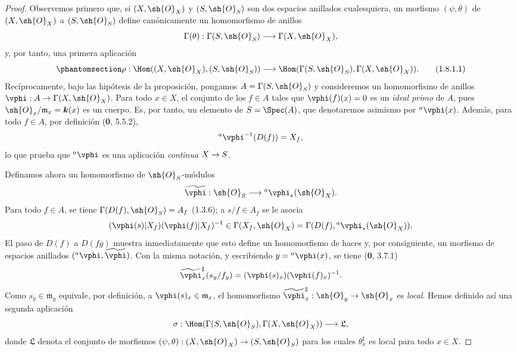 \documentclass[oneside,10pt]{amsart}
\makeatletter
\newcommand{\ega@arrow}[2]{\mathchoice{#1}{#2}{#2}{#2}}
\renewcommand{\to}{\ega@arrow{\longrightarrow}{\rightarrow}}
\let\EGAOriginalLabel\label
\renewcommand{\label}[1]{\phantomsection\EGAOriginalLabel{#1}}
\makeatother
\begin{document}
\begin{proof}
Observemos primero que, si $(X,\sh{O}_X)$ y $(S,\sh{O}_S)$ son dos
espacios anillados cualesquiera, un morfismo $(\psi,\theta)$ de
$(X,\sh{O}_X)$ a $(S,\sh{O}_S)$ define canónicamente un homomorfismo
de anillos
\[
  \Gamma(\theta):\Gamma(S,\sh{O}_S)\to\Gamma(X,\sh{O}_X),
\]
y, por tanto, una primera aplicación
\begin{equation}
\label{ega2:addendum:I.1.8.1.1}
  \rho:\Hom((X,\sh{O}_X),(S,\sh{O}_S))
  \to\Hom(\Gamma(S,\sh{O}_S),\Gamma(X,\sh{O}_X)).
\tag{1.8.1.1}
\end{equation}
Recíprocamente, bajo las hipótesis de la proposición, pongamos
$A=\Gamma(S,\sh{O}_S)$ y consideremos un homomorfismo de anillos
$\vphi:A\to\Gamma(X,\sh{O}_X)$. Para todo $x\in X$, el conjunto de
los $f\in A$ tales que $\vphi(f)(x)=0$ es un \emph{ideal primo} de $A$, pues
$\sh{O}_x/\mathfrak{m}_x=\boldsymbol k(x)$ es un cuerpo. Es, por tanto, un
elemento de $S=\Spec(A)$, que denotaremos asimismo por
${}^a\vphi(x)$. Además, para todo $f\in A$, por definición (\textbf 0, 5.5.2),
\[
  {}^a\vphi^{-1}(D(f))=X_f,
\]
lo que prueba que ${}^a\vphi$ es una aplicación \emph{continua} $X\to S$.

Definamos ahora un homomorfismo de $\sh{O}_S$-módulos
\[
  \widetilde{\vphi}:\sh{O}_S\to{}^a\vphi_*(\sh{O}_X).
\]
Para todo $f\in A$, se tiene
$\Gamma(D(f),\sh{O}_S)=A_f$ (1.3.6); a $s/f\in A_f$ se le asocia
\[
  (\vphi(s)|X_f)(\vphi(f)|X_f)^{-1}
  \in\Gamma(X_f,\sh{O}_X)
  =\Gamma(D(f),{}^a\vphi_*(\sh{O}_X)).
\]
El paso de $D(f)$ a $D(fg)$ muestra inmediatamente que esto define un
homomorfismo de haces y, por consiguiente, un morfismo de espacios
anillados $({}^a\vphi,\widetilde{\vphi})$. Con la misma notación, y
escribiendo $y={}^a\vphi(x)$, se tiene (\textbf 0, 3.7.1)
\[
  \widetilde{\vphi}_x^\sharp(s_y/f_y)
  =(\vphi(s)_x)(\vphi(f)_x)^{-1}.
\]
Como $s_y\in\mathfrak{m}_y$ equivale, por definición, a
$\vphi(s)_x\in\mathfrak{m}_x$, el homomorfismo
$\widetilde{\vphi}_x^\sharp:\sh{O}_y\to\sh{O}_x$ es \emph{local}. Hemos
definido así una segunda aplicación
\[
  \sigma:\Hom(\Gamma(S,\sh{O}_S),\Gamma(X,\sh{O}_X))
  \to\mathfrak{L},
\]
donde $\mathfrak{L}$ denota el conjunto de morfismos
$(\psi,\theta):(X,\sh{O}_X)\to(S,\sh{O}_S)$ para los cuales
$\theta_x^\sharp$ es local para todo $x\in X$.


\end{proof}
\end{document}

